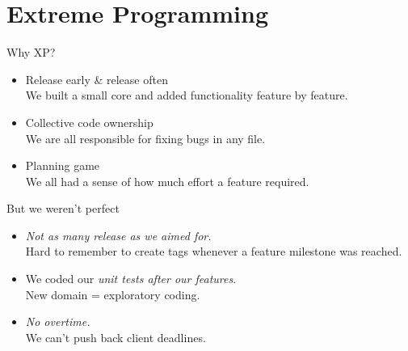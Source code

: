\documentclass[]{beamer}
\begin{document}
\section{Extreme Programming}
\begin{frame}{Why XP?}
  \begin{block}{}
    \begin{itemize}
    \item Release early \& release often \\
      We built a small core and added functionality feature by
      feature.
    \item Collective code ownership \\
      We are all responsible for fixing bugs in any file.
    \item Planning game \\
      We all had a sense of how much effort a feature required.
    \end{itemize}
  \end{block}
\end{frame}

\begin{frame}{But we weren't perfect}
  \begin{itemize}
  \item \emph{Not as many release as we aimed for.} \\
    Hard to remember to create tags whenever a feature milestone was
    reached.
  \item We coded our \emph{unit tests after our features}. \\
    New domain = exploratory coding.
  \item \emph{No overtime.} \\
    We can't push back client deadlines.
  \end{itemize}
\end{frame}
\end{document}
